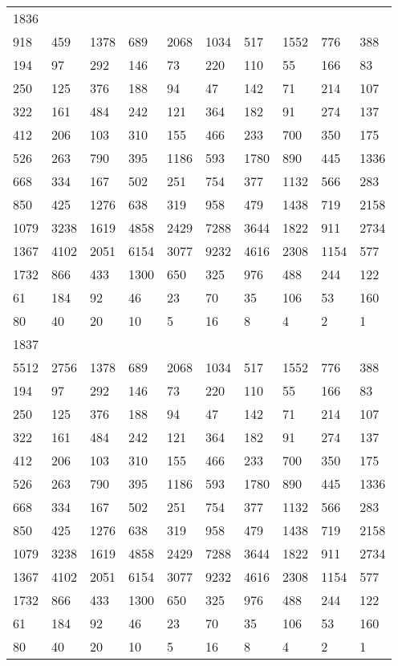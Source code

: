 \begin{longtable}{*{10}{l}}
1836&&&&&&&&&\\
918& 459& 1378& 689& 2068& 1034& 517& 1552& 776& 388\\
194& 97& 292& 146& 73& 220& 110& 55& 166& 83\\
250& 125& 376& 188& 94& 47& 142& 71& 214& 107\\
322& 161& 484& 242& 121& 364& 182& 91& 274& 137\\
412& 206& 103& 310& 155& 466& 233& 700& 350& 175\\
526& 263& 790& 395& 1186& 593& 1780& 890& 445& 1336\\
668& 334& 167& 502& 251& 754& 377& 1132& 566& 283\\
850& 425& 1276& 638& 319& 958& 479& 1438& 719& 2158\\
1079& 3238& 1619& 4858& 2429& 7288& 3644& 1822& 911& 2734\\
1367& 4102& 2051& 6154& 3077& 9232& 4616& 2308& 1154& 577\\
1732& 866& 433& 1300& 650& 325& 976& 488& 244& 122\\
61& 184& 92& 46& 23& 70& 35& 106& 53& 160\\
80& 40& 20& 10& 5& 16& 8& 4& 2& 1\\

1837&&&&&&&&&\\
5512& 2756& 1378& 689& 2068& 1034& 517& 1552& 776& 388\\
194& 97& 292& 146& 73& 220& 110& 55& 166& 83\\
250& 125& 376& 188& 94& 47& 142& 71& 214& 107\\
322& 161& 484& 242& 121& 364& 182& 91& 274& 137\\
412& 206& 103& 310& 155& 466& 233& 700& 350& 175\\
526& 263& 790& 395& 1186& 593& 1780& 890& 445& 1336\\
668& 334& 167& 502& 251& 754& 377& 1132& 566& 283\\
850& 425& 1276& 638& 319& 958& 479& 1438& 719& 2158\\
1079& 3238& 1619& 4858& 2429& 7288& 3644& 1822& 911& 2734\\
1367& 4102& 2051& 6154& 3077& 9232& 4616& 2308& 1154& 577\\
1732& 866& 433& 1300& 650& 325& 976& 488& 244& 122\\
61& 184& 92& 46& 23& 70& 35& 106& 53& 160\\
80& 40& 20& 10& 5& 16& 8& 4& 2& 1\\


\end{longtable}
